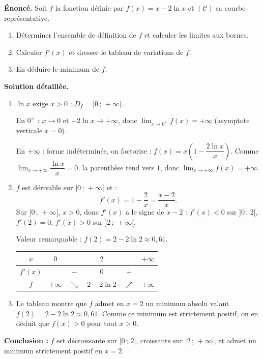 \documentclass[11pt]{article}
\newcommand{\cle}[1]{{\popxbold\color{popdark}#1}}
\begin{document}
\begin{exoresolu}[Étude complète de $f(x)=x-2\ln x$]
\textbf{Énoncé.} Soit $f$ la fonction définie par $f(x)=x-2\ln x$ et $(\mathcal{C})$ sa courbe représentative.
\begin{enumerate}
\item Déterminer l'ensemble de définition de $f$ et calculer les limites aux bornes.
\item Calculer $f'(x)$ et dresser le tableau de variations de $f$.
\item En déduire le minimum de $f$.
\end{enumerate}
\tcblower
\textbf{Solution détaillée.}
\begin{enumerate}
\item $\ln x$ exige $x>0$ : $D_f=]0\,;\,+\infty[$.

En $0^+$ : $x\to 0$ et $-2\ln x \to +\infty$, donc $\displaystyle\lim_{x\to 0^+}f(x)=+\infty$ (asymptote verticale $x=0$).

En $+\infty$ : forme indéterminée, on factorise : $f(x)=x\left(1-\dfrac{2\ln x}{x}\right)$. Comme $\displaystyle\lim_{x\to+\infty}\dfrac{\ln x}{x}=0$, la parenthèse tend vers $1$, donc $\displaystyle\lim_{x\to+\infty}f(x)=+\infty$.
\item $f$ est dérivable sur $]0\,;\,+\infty[$ et :
\[ f'(x)=1-\frac{2}{x}=\frac{x-2}{x}. \]
Sur $]0\,;\,+\infty[$, $x>0$, donc $f'(x)$ a le signe de $x-2$ : $f'(x)<0$ sur $]0\,;\,2[$, $f'(2)=0$, $f'(x)>0$ sur $]2\,;\,+\infty[$.

Valeur remarquable : $f(2)=2-2\ln 2 \approx 0{,}61$.

\begin{center}
\begin{tabular}{|c|ccccc|}\hline
$x$ & $0$ & & $2$ & & $+\infty$ \\ \hline
$f'(x)$ & & $-$ & $0$ & $+$ & \\ \hline
$f$ & $+\infty$ & $\searrow$ & $2-2\ln 2$ & $\nearrow$ & $+\infty$ \\ \hline
\end{tabular}
\end{center}
\item Le tableau montre que $f$ admet en $x=2$ un \cle{minimum} absolu valant $f(2)=2-2\ln 2 \approx 0{,}61$. Comme ce minimum est strictement positif, on en déduit que $f(x)>0$ pour tout $x>0$.
\end{enumerate}
\textbf{Conclusion :} $f$ est décroissante sur $]0\,;\,2]$, croissante sur $[2\,;\,+\infty[$, et admet un minimum strictement positif en $x=2$.
\end{exoresolu}
\end{document}
